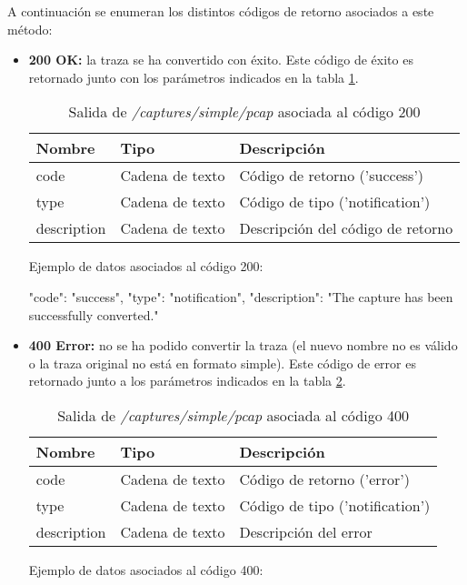 A continuación se enumeran los distintos códigos de retorno asociados a este método:
\begin{itemize}

\item{\textbf{200 OK:} la \gls{traza} se ha convertido con éxito. Este código de éxito es retornado junto con los parámetros indicados en la tabla \ref{extra:api:capturessimplepcap:ok}.
\begin{table}[H]
\centering
\begin{tabular}{|l|l|l|}
\hline
\rowcolor[HTML]{F5F5F5}
\textbf{Nombre}  & \textbf{Tipo}   & \textbf{Descripción}              \\ \hline
code             & Cadena de texto & Código de retorno ('success')     \\ \hline
type             & Cadena de texto & Código de tipo ('notification')   \\ \hline
description      & Cadena de texto & Descripción del código de retorno \\ \hline
\end{tabular}
\caption{Salida de \textit{/captures/simple/pcap} asociada al código 200}
\label{extra:api:capturessimplepcap:ok}
\end{table}
\begin{minipage}{\textwidth}
Ejemplo de datos asociados al código 200:

\begin{code}[language=json]
{
  "code": "success",
  "type": "notification",
  "description": "The capture has been successfully converted."
}
\end{code}
\end{minipage}
}

\item{\textbf{400 Error:} no se ha podido convertir la \gls{traza} (el nuevo nombre no es válido o la \gls{traza} original no está en formato \gls{simple}). Este código de error es retornado junto a los parámetros indicados en la tabla \ref{extra:api:capturessimplepcap:error}.
\begin{table}[H]
\centering
\begin{tabular}{|l|l|l|}
\hline
\rowcolor[HTML]{F5F5F5}
\textbf{Nombre}  & \textbf{Tipo}   & \textbf{Descripción}            \\ \hline
code             & Cadena de texto & Código de retorno ('error')     \\ \hline
type             & Cadena de texto & Código de tipo ('notification') \\ \hline
description      & Cadena de texto & Descripción del error           \\ \hline
\end{tabular}
\caption{Salida de \textit{/captures/simple/pcap} asociada al código 400}
\label{extra:api:capturessimplepcap:error}
\end{table}
\begin{minipage}{\textwidth}
Ejemplo de datos asociados al código 400:


\end{minipage}}
\end{itemize}
